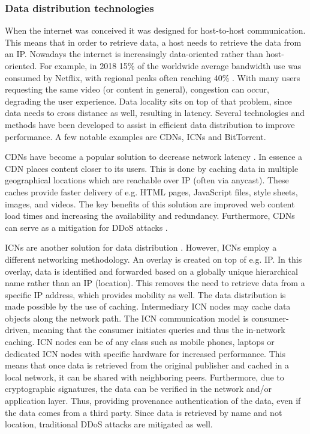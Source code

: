 \subsubsection{Data distribution technologies}
\label{introduction-ndn}
When the internet was conceived it was designed for host-to-host communication. This means that in order to retrieve data, a host needs to retrieve the data from an IP. Nowadays the internet is increasingly data-oriented rather than host-oriented. For example, in 2018 15\% of the worldwide average bandwidth use was consumed by Netflix, with regional peaks often reaching 40\% \cite{introduction-netflix}. With many users requesting the same video (or content in general), congestion can occur, degrading the user experience. Data locality sits on top of that problem, since data needs to cross distance as well, resulting in latency. Several technologies and methods have been developed to assist in efficient data distribution to improve performance. A few notable examples are CDNs, ICNs and BitTorrent.

CDNs have become a popular solution to decrease network latency \cite{lee2012towards}. In essence a CDN places content closer to its users. This is done by caching data in multiple geographical locations which are reachable over IP (often via anycast). These caches provide faster delivery of e.g. HTML pages, JavaScript files, style sheets, images, and videos. The key benefits of this solution are improved web content load times and increasing the availability and redundancy. Furthermore, CDNs can serve as a mitigation for DDoS attacks \cite{cloudflare-cdn}.

ICNs are another solution for data distribution \cite{jacobson2009networking}. However, ICNs employ a different networking methodology. An overlay is created on top of e.g. IP. In this overlay, data is identified and forwarded based on a globally unique hierarchical name rather than an IP (location). This removes the need to retrieve data from a specific IP address, which provides mobility as well. The data distribution is made possible by the use of caching. Intermediary ICN nodes may cache data objects along the network path. The ICN communication model is consumer-driven, meaning that the consumer initiates queries and thus the in-network caching. ICN nodes can be of any class such as mobile phones, laptops or dedicated ICN nodes with specific hardware for increased performance. This means that once data is retrieved from the original publisher and cached in a local network, it can be shared with neighboring peers. Furthermore, due to cryptographic signatures, the data can be verified in the network and/or application layer. Thus, providing provenance authentication of the data, even if the data comes from a third party. Since data is retrieved by name and not location, traditional DDoS attacks are mitigated as well.


